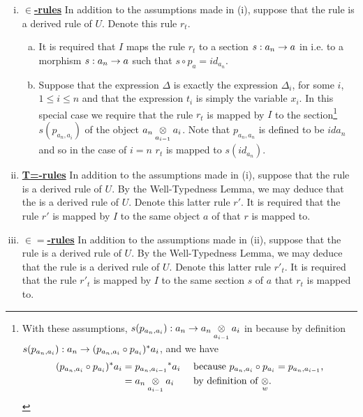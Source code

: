 \begin{definition}
\begin{enumerate}[(i)]
\item \underline{\textbf{$\boldsymbol {\in}$-rules}} 
In addition to the assumptions made in (i),  suppose that the rule
 is a  derived rule of $U$. 
Denote this rule $r_t$. 
\begin{enumerate}[(a)]
\item 
It is required that $I$ maps the rule $r_t$ to a section
 $s:a_n \morph a$ in \catcw i.e. to a morphism $s:a_n \morph a$ such that $s \circ p_a = id_{a_n}$. 
\item Suppose that the  expression $\Delta$ is exactly the expression $\Delta_i$, for some $i$, $1 \leq i \leq n$ and that the expression $t_i$ is simply the variable $x_i$. 
In this special case we require that the rule $r_t$  is mapped by $I$ to the section\footnote{
With these assumptions, $s(p_{a_n,a_i}): a_n \morph \crossx{a_n}{a_i}{a_{i-1}}$ in \catcw because by definition  $s(p_{a_n,a_i}): a_n  \morph (p_{a_n,a_i} \circ p_{a_i})^*a_i$,
and we have 
\begin{align*}
(p_{a_n,a_i} \circ p_{a_i})^*a_i &= {p_{a_n,a_{i-1}}} ^* a_i  && \mbox{ because $p_{a_n,a_i} \circ p_{a_i}=p_{a_n,a_{i-1}}$,} \\
                                 &= \crossx{a_n}{a_i}{a_{i-1}} && \mbox{ by definition of $\crossx{}{}{w}$}.
\end{align*}
} %
$s(p_{a_n,a_i})$ of the object $\crossx{a_n}{a_i}{a_{i-1}}$. Note that $p_{a_n,a_n}$ is defined to be $id{a_n}$ and so in the case of $i=n$ $r_t$
is mapped to   $s(id_{a_n})$. 
\end{enumerate}
\item \underline{\textbf{T=-rules}} 
In addition to the assumptions made in (i), suppose that  
the rule  is a derived rule of $U$. 
By the Well-Typedness Lemma, we may deduce that the
 is a derived rule of $U$. Denote this latter rule $r'$.
It is required that the rule $r'$ is mapped by $I$ to the same object $a$ of \catcw that $r$ is mapped to.

\item \underline{\textbf{$\boldsymbol{\in=}$-rules}} 
In addition to the assumptions made in (ii),  suppose that the rule
is a derived rule of $U$. 
By the Well-Typedness Lemma, we may deduce that the rule
 is a  derived rule of $U$. 
Denote this latter rule $r'_t$.
It is required that the rule $r'_t$ is mapped by $I$ to the same section $s$ of $a$ that $r_t$ is mapped to.


\end{enumerate}
\end{definition}
